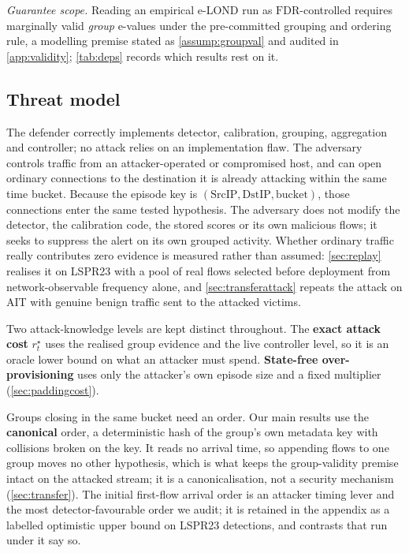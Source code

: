 \documentclass[conference]{IEEEtran}
\newcommand{\FDR}{\mathrm{FDR}}
\begin{document}
\emph{Guarantee scope.} Reading an empirical e-LOND run as $\FDR$-controlled requires marginally valid
\emph{group} e-values under the pre-committed grouping and ordering rule, a modelling premise stated
as \cref{assump:groupval} and audited in \cref{app:validity}; \cref{tab:deps} records which results
rest on it.

\subsection{Threat model}\label{sec:threat}

The defender correctly implements detector, calibration, grouping, aggregation and controller; no attack
relies on an implementation flaw. The adversary controls traffic from an attacker-operated or
compromised host, and can open ordinary connections to the destination it is already attacking within
the same time bucket. Because the episode key is $(\mathrm{SrcIP},\mathrm{DstIP},\text{bucket})$, those
connections enter the same tested hypothesis. The adversary does not modify the detector, the
calibration code, the stored scores or its own malicious flows; it seeks to suppress the alert on its
own grouped activity. Whether ordinary traffic really contributes zero evidence is measured rather
than assumed: \cref{sec:replay} realises it on LSPR23 with a pool of real flows selected before
deployment from network-observable frequency alone, and \cref{sec:transferattack} repeats the attack
on AIT with genuine benign traffic sent to the attacked victims.

Two attack-knowledge levels are kept distinct throughout.
The \textbf{exact attack cost} $r^{\star}_t$ uses the realised group evidence and the live controller
level, so it is an oracle lower bound on what an attacker must spend. \textbf{State-free
over-provisioning} uses only the attacker's own episode size and a fixed multiplier
(\cref{sec:paddingcost}).

Groups closing in the same bucket need an order. Our main results use the \textbf{canonical} order, a
deterministic hash of the group's own metadata key with collisions broken on the key. It reads no
arrival time, so appending flows to one group moves no other hypothesis, which is what keeps the
group-validity premise intact on the attacked stream; it is a canonicalisation, not a security mechanism
(\cref{sec:transfer}). The initial first-flow arrival order is an attacker timing lever and the most
detector-favourable order we audit; it is retained in the appendix as a labelled optimistic upper bound
on LSPR23 detections, and contrasts that run under it say so.
\end{document}
